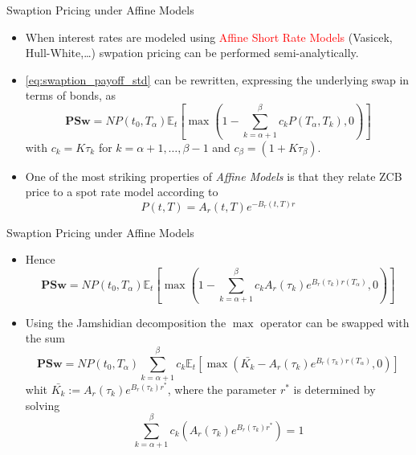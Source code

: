 \documentclass{beamer}
\begin{document}
\begin{frame}{Swaption Pricing under Affine Models}
\begin{itemize}
	\item When interest rates are modeled using \textcolor{red}{Affine Short Rate Models} (Vasicek, Hull-White,\ldots) swpation pricing can be performed semi-analytically.
	\item \cref{eq:swaption_payoff_std} can be rewritten, expressing the underlying swap in terms of bonds, as
\begin{equation*}
\textbf{PSw}=NP(t_0, T_\alpha)\mathbb{E}_t\left[\max\left(1-\sum_{k=\alpha+1}^\beta c_kP(T_\alpha,T_k), 0\right)\right]
\end{equation*}
with $c_k=K\tau_k$ for $k=\alpha+1,\ldots,\beta-1$ and $c_\beta=(1+K\tau_\beta)$.
	\item One of the most striking properties of \emph{Affine Models} is that they relate ZCB price to a spot rate model according to 
	\begin{equation*}
		P(t,T) = A_r(t,T)e^{-B_r(t,T)r}
	\end{equation*} 
\end{itemize}
\end{frame}

\begin{frame}{Swaption Pricing under Affine Models}
\begin{itemize}
\item Hence
\begin{equation*}
\textbf{PSw}=NP(t_0, T_\alpha)\mathbb{E}_t\left[\max\left(1-\sum_{k=\alpha+1}^\beta c_k A_r(\tau_k)e^{B_r(\tau_k)r(T_\alpha)}, 0\right)\right]
\end{equation*}
	\item Using the Jamshidian decomposition the $\max$ operator can be swapped with the sum
\begin{equation*}
\textbf{PSw}=NP(t_0, T_\alpha)\sum_{k=\alpha+1}^\beta c_k \mathbb{E}_t\left[\max\left(\bar{K_k} - A_r(\tau_k)e^{B_r(\tau_k)r(T_\alpha)}, 0\right)\right]
\end{equation*}
whit $\bar{K_k} := A_r(\tau_k)e^{B_r(\tau_k)r^{*}}$, where the parameter $r^{*}$ is determined by solving
\begin{equation*}
\sum_{k=\alpha+1}^\beta c_k \left(A_r(\tau_k)e^{B_r(\tau_k)r^{*}}\right) = 1
\end{equation*}
\end{itemize}
\end{frame}
\end{document}
